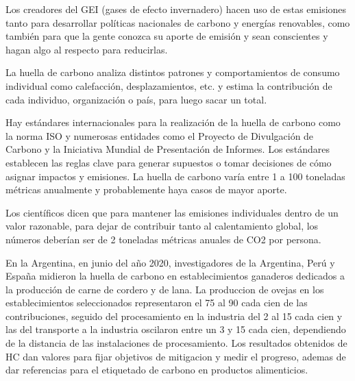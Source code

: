 \documentclass[runningheads]{llncs}
\begin{document}
\bigskip
Los creadores del GEI (gases de efecto invernadero) hacen uso de estas emisiones tanto para desarrollar políticas nacionales de carbono y energías renovables, como también para que la gente conozca su aporte de emisión y sean conscientes y hagan algo al respecto para reducirlas.

\bigskip
La huella de carbono analiza distintos patrones y comportamientos de consumo individual como calefacción, desplazamientos, etc. y estima la contribución de cada individuo, organización o país, para luego sacar un total.

\bigskip
Hay estándares internacionales para la realización de la huella de carbono como la norma ISO y numerosas entidades como el Proyecto de Divulgación de Carbono y la Iniciativa Mundial de Presentación de Informes. Los estándares establecen las reglas clave para generar supuestos o tomar decisiones de cómo asignar impactos y emisiones.
La huella de carbono varía entre 1 a 100 toneladas métricas anualmente y probablemente haya casos de mayor aporte.

\bigskip
Los científicos dicen que para mantener las emisiones individuales dentro de un valor razonable, para dejar de contribuir tanto al calentamiento global, los números deberían ser de 2 toneladas métricas anuales de CO2 por persona.

\bigskip
En la Argentina, en junio del año 2020, investigadores de la Argentina, Perú y España midieron la huella de carbono en establecimientos ganaderos dedicados a la producción de carne de cordero y de lana. La produccion de ovejas en los establecimientos seleccionados representaron el 75 al 90 cada cien de las contribuciones, seguido del procesamiento en la industria del 2 al 15 cada cien y las del transporte a la industria oscilaron entre un 3 y 15 cada cien, dependiendo de la distancia de las instalaciones de procesamiento. Los resultados obtenidos de HC dan valores para fijar objetivos de mitigacion y medir el progreso, ademas de dar referencias para el etiquetado de carbono en productos alimenticios.
\end{document}
